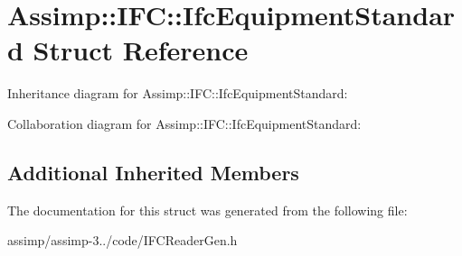 \hypertarget{struct_assimp_1_1_i_f_c_1_1_ifc_equipment_standard}{\section{Assimp\+:\+:I\+F\+C\+:\+:Ifc\+Equipment\+Standard Struct Reference}
\label{struct_assimp_1_1_i_f_c_1_1_ifc_equipment_standard}
}


Inheritance diagram for Assimp\+:\+:I\+F\+C\+:\+:Ifc\+Equipment\+Standard\+:


Collaboration diagram for Assimp\+:\+:I\+F\+C\+:\+:Ifc\+Equipment\+Standard\+:
\subsection*{Additional Inherited Members}


The documentation for this struct was generated from the following file\+:\begin{DoxyCompactItemize}
\item 
assimp/assimp-\/3../code/I\+F\+C\+Reader\+Gen.\+h\end{DoxyCompactItemize}
